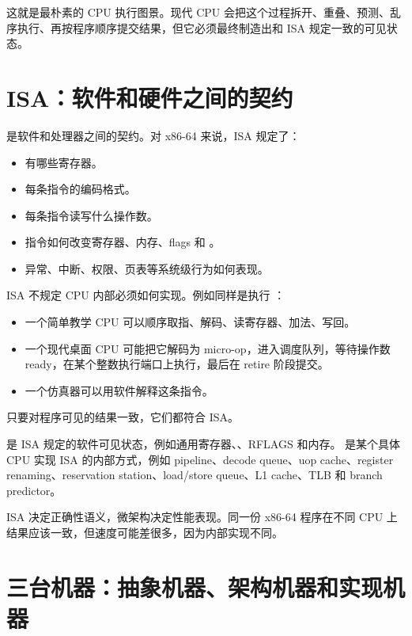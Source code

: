 这就是最朴素的 CPU 执行图景。现代 CPU 会把这个过程拆开、重叠、预测、乱序执行、再按程序顺序提交结果，但它必须最终制造出和 ISA 规定一致的可见状态。

\section{ISA：软件和硬件之间的契约}

 是软件和处理器之间的契约。对 x86-64 来说，ISA 规定了：

\begin{itemize}
  \item 有哪些寄存器。
  \item 每条指令的编码格式。
  \item 每条指令读写什么操作数。
  \item 指令如何改变寄存器、内存、flags 和 。
  \item 异常、中断、权限、页表等系统级行为如何表现。
\end{itemize}

ISA 不规定 CPU 内部必须如何实现。例如同样是执行 ：

\begin{itemize}
  \item 一个简单教学 CPU 可以顺序取指、解码、读寄存器、加法、写回。
  \item 一个现代桌面 CPU 可能把它解码为 micro-op，进入调度队列，等待操作数 ready，在某个整数执行端口上执行，最后在 retire 阶段提交。
  \item 一个仿真器可以用软件解释这条指令。
\end{itemize}

只要对程序可见的结果一致，它们都符合 ISA。

 是 ISA 规定的软件可见状态，例如通用寄存器、、RFLAGS 和内存。  是某个具体 CPU 实现 ISA 的内部方式，例如 pipeline、decode queue、uop cache、register renaming、reservation station、load/store queue、L1 cache、TLB 和 branch predictor。

\begin{keyidea}
ISA 决定正确性语义，微架构决定性能表现。同一份 x86-64 程序在不同 CPU 上结果应该一致，但速度可能差很多，因为内部实现不同。
\end{keyidea}

\section{三台机器：抽象机器、架构机器和实现机器}

